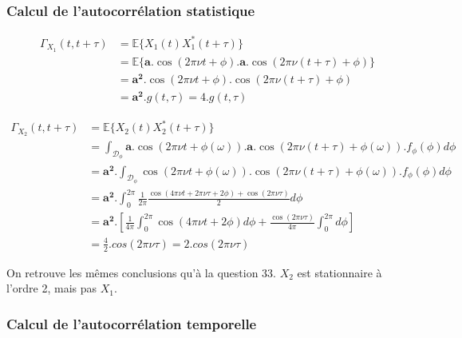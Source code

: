 \documentclass{article}
\begin{document}
\subsubsection*{Calcul de l'autocorrélation statistique}

\begin{equation}
\begin{aligned}
\Gamma_{X_1}(t,t+\tau)
& = \mathbb{E}\{X_1(t)X_1^*(t+\tau)\} \\
& = \mathbb{E}\{\boldsymbol{a}.\cos(2\pi\nu t + \phi).\boldsymbol{a}.\cos(2\pi\nu(t+\tau) + \phi)\} \\
& = \boldsymbol{a^2}.\cos(2\pi\nu t + \phi).\cos(2\pi\nu(t+\tau) + \phi) \\
& = \boldsymbol{a^2}.g(t,\tau) = 4.g(t,\tau)
\end{aligned}
\end{equation}

\begin{equation}
\begin{aligned}
\Gamma_{X_2}(t,t+\tau)
& = \mathbb{E}\{X_2(t)X_2^*(t+\tau)\} \\
& = \int_{\mathcal{D}_\phi}\boldsymbol{a}.\cos(2\pi\nu t + \phi(\omega)).\boldsymbol{a}.\cos(2\pi\nu(t+\tau) + \phi(\omega)).f_{\phi}(\phi)\mathit{d\phi} \\
& = \boldsymbol{a^2}.\int_{\mathcal{D}_\phi}\cos(2\pi\nu t + \phi(\omega)).\cos(2\pi\nu(t+\tau) + \phi(\omega)).f_{\phi}(\phi)d\phi \\
& = \boldsymbol{a^2}.\int_0^{2\pi}\frac{1}{2\pi}\frac{\cos(4\pi\nu t + 2\pi\nu\tau + 2\phi) + \cos(2\pi\nu\tau)}{2}d\phi \\
& = \boldsymbol{a^2}.[\frac{1}{4\pi}\int_0^{2\pi}\cos(4\pi\nu t + 2\phi)d\phi + \frac{\cos(2\pi\nu\tau)}{4\pi}\int_0^{2\pi}d\phi] \\
& = \frac{4}{2}.cos(2\pi\nu\tau) = 2.cos(2\pi\nu\tau)
\end{aligned}
\end{equation}

\noindent
On retrouve les mêmes conclusions qu'à la question 33. $X_2$ est stationnaire à l'ordre 2, mais pas $X_1$.

\subsubsection*{Calcul de l'autocorrélation temporelle}
\end{document}

